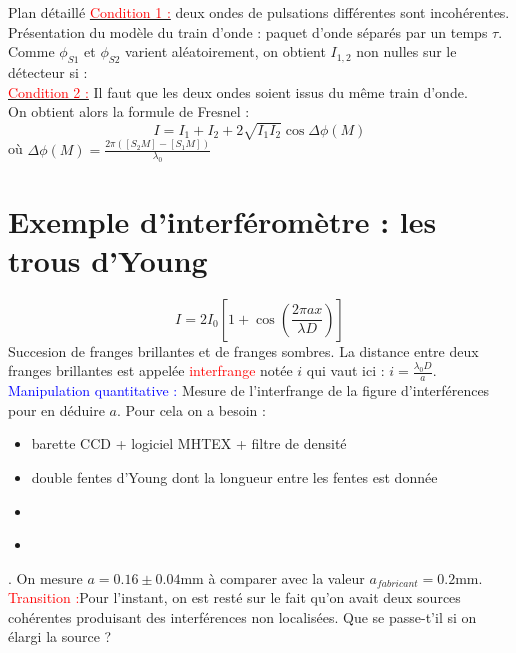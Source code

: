 \begin{reportBlock}{Plan détaillé}
  \underline{\textcolor{red}{Condition 1 :}} deux ondes de pulsations différentes sont incohérentes.\\

  Présentation du modèle du train d'onde : paquet d'onde séparés par un temps $\tau$. Comme $\phi_{S1}$ et $\phi_{S2}$ varient aléatoirement, on obtient $I_{1,2}$ non nulles sur le détecteur si :\\
  \underline{\textcolor{red}{Condition 2 :}} Il faut que les deux ondes soient issus du même train d'onde. \\

  On obtient alors la formule de Fresnel :
  \begin{equation}
      I = I_1 + I_2 + 2\sqrt{I_1I_2}\cos{\Delta\phi(M)}  \end{equation}
      où $\Delta\phi(M) = \frac{2\pi([S_2M]-[S_1M])}{\lambda_0}$

\section{Exemple d'interféromètre : les trous d'Young}

\begin{equation}
    I = 2I_0\left[1+\cos\left(\frac{2\pi ax}{\lambda D}\right)\right]
\end{equation}
Succesion de franges brillantes et de franges sombres. La distance entre deux franges brillantes est appelée \textcolor{red}{interfrange} notée $i$ qui vaut ici : $i=\frac{\lambda_0D}{a}$.\\
\textcolor{blue}{Manipulation quantitative :} Mesure de l'interfrange de la figure d'interférences pour en déduire $a$. Pour cela on a besoin :
\begin{itemize}
    \item barette CCD + logiciel MHTEX + filtre de densité
    \item double fentes d'Young dont la longueur entre les fentes est donnée
    \item 
\end{itemize}
\begin{itemize}
    \item 
\end{itemize}
. On mesure $a=0.16\pm0.04$mm à comparer avec la valeur $a_{fabricant}=0.2$mm.\\

\textcolor{red}{Transition :}Pour l'instant, on est resté sur le fait qu'on avait deux sources cohérentes produisant des interférences non localisées. Que se passe-t'il si on élargi la source ?


\end{reportBlock}
